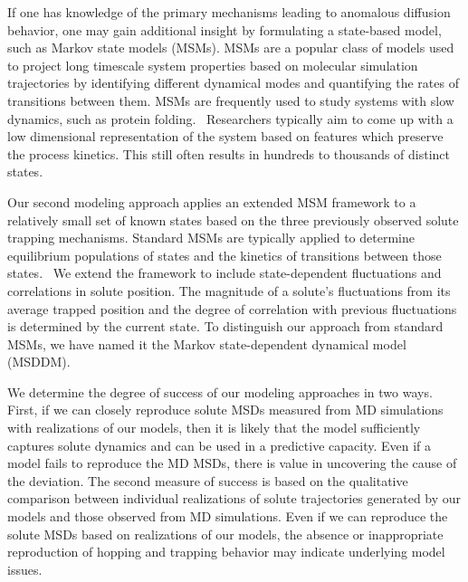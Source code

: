 \documentclass[aps,pre,preprint,groupedaddress,longbibliography]{revtex4-2}
\begin{document}
  If one has knowledge of the primary mechanisms leading to anomalous diffusion
  behavior, one may gain additional insight by formulating a state-based model,
  such as Markov state models (MSMs). MSMs are a popular class of models used
  to project long timescale system properties based on molecular simulation
  trajectories by identifying different dynamical modes and quantifying the
  rates of transitions between them. MSMs are frequently used to study systems
  with slow dynamics, such as protein
  folding.~\cite{snow_how_2005,chodera_automatic_2007} Researchers typically
  aim to come up with a low dimensional representation of the system based on
  features which preserve the process kinetics. This still often results in
  hundreds to thousands of distinct states.~\cite{chodera_markov_2014}

  Our second modeling approach applies an extended MSM framework to a
  relatively small set of known states based on the three previously observed
  solute trapping mechanisms. Standard MSMs are typically applied to determine
  equilibrium populations of states and the kinetics of transitions between
  those states.~\cite{bowman_using_2009} We extend the framework to include
  state-dependent fluctuations and correlations in solute position. The
  magnitude of a solute's fluctuations from its average trapped position and the
  degree of correlation with previous fluctuations is determined by the current
  state. To distinguish our approach from standard MSMs, we have named it the
  Markov state-dependent dynamical model (MSDDM).
  
  We determine the degree of success of our modeling approaches in two ways.
  First, if we can closely reproduce solute MSDs measured from MD simulations
  with realizations of our models, then it is likely that the model
  sufficiently captures solute dynamics and can be used in a predictive
  capacity. Even if a model fails to reproduce the MD MSDs, there is value in
  uncovering the cause of the deviation. 
  The second measure of success is based on the qualitative comparison between
  individual realizations of solute trajectories generated by our models and
  those observed from MD simulations. Even if we can reproduce the solute MSDs
  based on realizations of our models, the absence or inappropriate
  reproduction of hopping and trapping behavior may indicate underlying model
  issues. 
  
\end{document}
